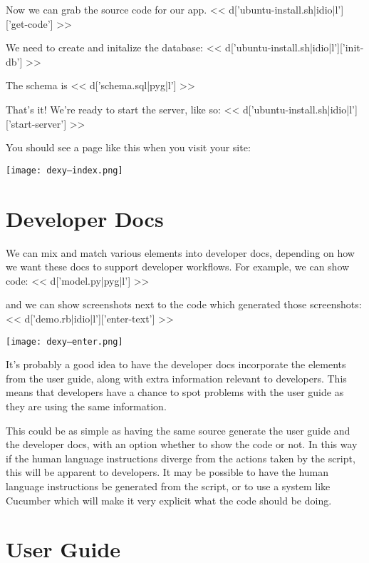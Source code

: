 \documentclass[a4paper]{tufte-handout}
\begin{document}
Now we can grab the source code for our app.
\scriptsize
<< d['ubuntu-install.sh|idio|l']['get-code'] >>
\normalsize

We need to create and initalize the database:
\scriptsize
<< d['ubuntu-install.sh|idio|l']['init-db'] >>
\normalsize

The schema is
\scriptsize
<< d['schema.sql|pyg|l'] >>
\normalsize

That's it! We're ready to start the server, like so:
\scriptsize
<< d['ubuntu-install.sh|idio|l']['start-server'] >>
\normalsize

You should see a page like this when you visit your site:

\texttt{[image: dexy--index.png]}

\normalfont

\section{Developer Docs}

We can mix and match various elements into developer docs, depending on how we want these docs to support developer workflows. For example, we can show code:
\scriptsize
<< d['model.py|pyg|l'] >>
\normalsize

and we can show screenshots next to the code which generated those screenshots:
\scriptsize
<< d['demo.rb|idio|l']['enter-text'] >>
\normalsize

\texttt{[image: dexy--enter.png]}

It's probably a good idea to have the developer docs incorporate the elements from the user guide, along with extra information relevant to developers. This means that developers have a chance to spot problems with the user guide as they are using the same information.

This could be as simple as having the same source generate the user guide and the developer docs, with an option whether to show the code or not. In this way if the human language instructions diverge from the actions taken by the script, this will be apparent to developers. It may be possible to have the human language instructions be generated from the script, or to use a system like Cucumber which will make it very explicit what the code should be doing.

\section{User Guide}
\end{document}
